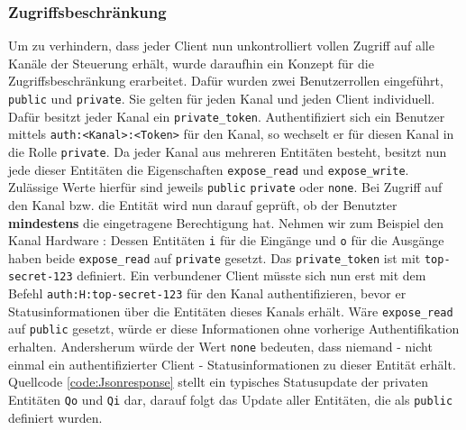 \subsubsection{Zugriffsbeschränkung}\label{chp:ums:websock:auth}
Um zu verhindern, dass jeder Client nun unkontrolliert vollen Zugriff auf alle Kanäle der Steuerung erhält, wurde daraufhin ein Konzept für die Zugriffsbeschränkung erarbeitet. Dafür wurden zwei Benutzerrollen eingeführt, \texttt{public} und \texttt{private}. Sie gelten für jeden Kanal und jeden Client individuell. Dafür besitzt jeder Kanal ein \texttt{private\_token}. Authentifiziert sich ein Benutzer mittels \texttt{auth:<Kanal>:<Token>} für den Kanal, so wechselt er für diesen Kanal in die Rolle \texttt{private}. Da jeder Kanal aus mehreren Entitäten besteht, besitzt nun jede dieser Entitäten die Eigenschaften \texttt{expose\_read} und \texttt{expose\_write}. Zulässige Werte hierfür sind jeweils \texttt{public} \texttt{private} oder \texttt{none}. Bei Zugriff auf den Kanal bzw. die Entität wird nun darauf geprüft, ob der Benutzter \textbf{mindestens} die eingetragene Berechtigung hat. Nehmen wir zum Beispiel den Kanal Hardware : Dessen Entitäten \texttt{i} für die Eingänge und \texttt{o} für die Ausgänge haben beide \texttt{expose\_read} auf \texttt{private} gesetzt. Das \texttt{private\_token} ist mit \texttt{top-secret-123} definiert. Ein verbundener Client müsste sich nun erst mit dem Befehl \texttt{auth:H:top-secret-123} für den Kanal authentifizieren, bevor er Statusinformationen über die Entitäten dieses Kanals erhält. Wäre \texttt{expose\_read} auf \texttt{public} gesetzt, würde er diese Informationen ohne vorherige Authentifikation erhalten. Andersherum würde der Wert \texttt{none} bedeuten, dass niemand - nicht einmal ein authentifizierter Client - Statusinformationen zu dieser Entität erhält. Quellcode \ref{code:Jsonresponse} stellt ein typisches Statusupdate der privaten Entitäten \texttt{Qo} und \texttt{Qi} dar, darauf folgt das Update aller Entitäten, die als \texttt{public} definiert wurden.  

